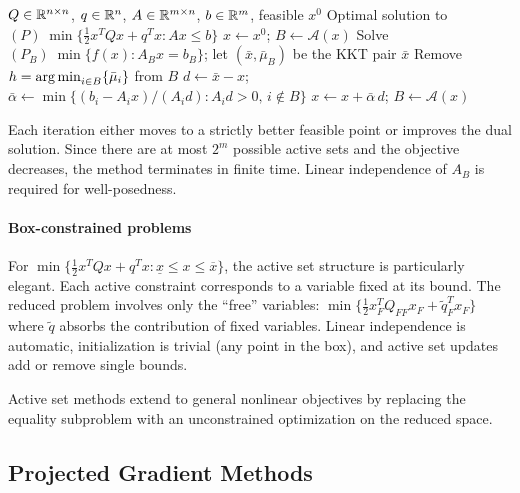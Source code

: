 \begin{algorithm}
	\caption{Active Set Method for Quadratic Programs (ASMQP)}
	\label{alg:ASMQP}
	\begin{algorithmic}[1]
		\Require $Q \in \mathbb{R}^{n \times n}$, $q \in \mathbb{R}^n$, $A \in \mathbb{R}^{m \times n}$, $b \in \mathbb{R}^m$, feasible $x^0$
		\Ensure Optimal solution to $(P)\; \min\{\frac{1}{2} x^T Q x + q^T x : Ax \leq b\}$
			\State $x \gets x^0$;\; $B \gets \mathcal{A}(x)$
				\State Solve $(P_B)\; \min\{f(x) : A_B x = b_B\}$; let $(\bar{x}, \bar{\mu}_B)$ be the KKT pair
				 
					 \Return $\bar{x}$ 
					\Else
						\State Remove $h = \operatorname*{arg\,min}_{i \in B}\{\bar{\mu}_i\}$ from $B$ 
					\EndIf
				\Else
					\State $d \gets \bar{x} - x$;\;
						$\bar{\alpha} \gets \min\{(b_i - A_i x)/(A_i d) : A_i d > 0,\, i \notin B\}$
					\State $x \gets x + \bar{\alpha}\, d$;\; $B \gets \mathcal{A}(x)$
				\EndIf
			\EndWhile
		\EndProcedure
	\end{algorithmic}
\end{algorithm}

Each iteration either moves to a strictly better feasible point or improves the dual solution.
Since there are at most $2^m$ possible active sets and the objective decreases, the method terminates in finite time.
Linear independence of $A_B$ is required for well-posedness.

\paragraph{Box-constrained problems}

For $\min\{\frac{1}{2} x^T Q x + q^T x : \underline{x} \leq x \leq \overline{x}\}$, the active set structure is particularly elegant.
Each active constraint corresponds to a variable fixed at its bound.
The reduced problem involves only the ``free'' variables: $\min\{\frac{1}{2} x_F^T Q_{FF} x_F + \tilde{q}_F^T x_F\}$ where $\tilde{q}$ absorbs the contribution of fixed variables.
Linear independence is automatic, initialization is trivial (any point in the box), and active set updates add or remove single bounds.

Active set methods extend to general nonlinear objectives by replacing the equality subproblem with an unconstrained optimization on the reduced space.


\subsection{Projected Gradient Methods}\label{sec:projected-gradient}

